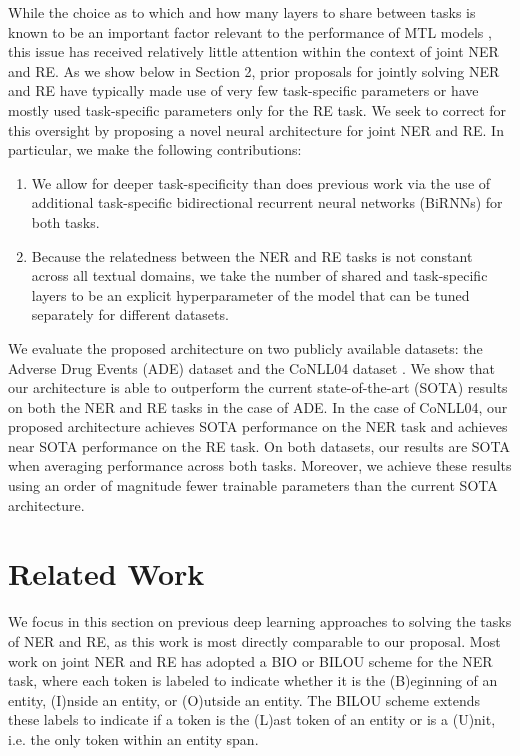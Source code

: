 \documentclass{article}
\begin{document}
While the choice as to which and how many layers to share between tasks is known to be an important factor relevant to the performance of MTL models \cite{Zhao_2018,vandenhende2019branched}, this issue has received relatively little attention within the context of joint NER and RE. As we show below in Section 2, prior proposals for jointly solving NER and RE have typically made use of very few task-specific parameters or have mostly used task-specific parameters only for the RE task. We seek to correct for this oversight by proposing a novel neural architecture for joint NER and RE. In particular, we make the following contributions:
\begin{enumerate}
    \item We allow for deeper task-specificity than does previous work via the use of additional task-specific bidirectional recurrent neural networks (BiRNNs) for both tasks.
    \item Because the relatedness between the NER and RE tasks is not constant across all textual domains, we take the number of shared and task-specific layers to be an explicit hyperparameter of the model that can be tuned separately for different datasets.
\end{enumerate}

We evaluate the proposed architecture on two publicly available datasets: the Adverse Drug Events (ADE) dataset \cite{gurulingappa2012development} and the CoNLL04 dataset \cite{roth2004linear}. We show that our architecture is able to outperform the current state-of-the-art (SOTA) results on both the NER and RE tasks in the case of ADE. In the case of CoNLL04, our proposed architecture achieves SOTA performance on the NER task and achieves near SOTA performance on the RE task. On both datasets, our results are SOTA when averaging performance across both tasks. Moreover, we achieve these results using an order of magnitude fewer trainable parameters than the current SOTA architecture.

\section{Related Work}

We focus in this section on previous deep learning approaches to solving the tasks of NER and RE, as this work is most directly comparable to our proposal. Most work on joint NER and RE has adopted a BIO or BILOU scheme for the NER task, where each token is labeled to indicate whether it is the (B)eginning of an entity, (I)nside an entity, or (O)utside an entity. The BILOU scheme extends these labels to indicate if a token is the (L)ast token of an entity or is a (U)nit, i.e. the only token within an entity span.
\end{document}
